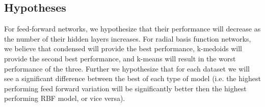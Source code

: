 \subsection{Hypotheses}
For feed-forward networks, we hypothesize that their performance will decrease as the number of their hidden layers increases. For radial basis function networks, we believe that condensed will provide the best performance, k-medoids will provide the second best performance, and k-means will result in the worst performance of the three. Further we hypothesize that for each dataset we will see a significant difference between the best of each type of model (i.e. the highest performing feed forward variation will be significantly better then the highest performing RBF model, or vice versa).